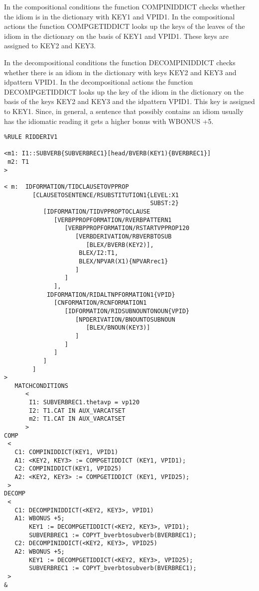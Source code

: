 In the compositional conditions the function COMPINIDDICT checks whether the
idiom is in the dictionary with KEY1 and VPID1. In the compositional actions
the function COMPGETIDDICT looks up the keys of the leaves of the idiom in the
dictionary on the basis of KEY1 and VPID1. These keys are assigned to KEY2 and
KEY3. 

In the decompositional conditions the function DECOMPINIDDICT
checks whether there is an idiom in the dictionary with keys KEY2 and KEY3
and idpattern VPID1. In the decompositional actions the function
DECOMPGETIDDICT looks up the key of the idiom in the dictionary on the basis of 
the keys KEY2 and KEY3 and the idpattern VPID1. This key is assigned to KEY1.
Since, in general, a sentence that possibly contains an idiom usually has the
idiomatic reading it gets a higher bonus with WBONUS +5. 

\begin{verbatim}
%RULE RIDDERIV1

<m1: I1::SUBVERB{SUBVERBREC1}[head/BVERB(KEY1){BVERBREC1}]
 m2: T1
>

< m:  IDFORMATION/TIDCLAUSETOVPPROP
        [CLAUSETOSENTENCE/RSUBSTITUTION1{LEVEL:X1 
                                         SUBST:2}
           [IDFORMATION/TIDVPPROPTOCLAUSE
              [VERBPPROPFORMATION/RVERBPATTERN1
                 [VERBPPROPFORMATION/RSTARTVPPROP120
                    [VERBDERIVATION/RBVERBTOSUB
                       [BLEX/BVERB(KEY2)],
                     BLEX/I2:T1,
                     BLEX/NPVAR(X1){NPVARrec1}
                    ]
                 ]
              ],
            IDFORMATION/RIDALTNPFORMATION1{VPID}
              [CNFORMATION/RCNFORMATION1
                 [IDFORMATION/RIDSUBNOUNTONOUN{VPID}
                    [NPDERIVATION/BNOUNTOSUBNOUN
                       [BLEX/BNOUN(KEY3)]
                    ]
                 ]
              ]
           ]
        ]
>
   MATCHCONDITIONS
      <
       I1: SUBVERBREC1.thetavp = vp120 
       I2: T1.CAT IN AUX_VARCATSET 
       m2: T1.CAT IN AUX_VARCATSET 
      >
COMP
 <
   C1: COMPINIDDICT(KEY1, VPID1)
   A1: <KEY2, KEY3> := COMPGETIDDICT (KEY1, VPID1);
   C2: COMPINIDDICT(KEY1, VPID25)
   A2: <KEY2, KEY3> := COMPGETIDDICT (KEY1, VPID25);
 >
DECOMP
 <
   C1: DECOMPINIDDICT(<KEY2, KEY3>, VPID1)
   A1: WBONUS +5;
       KEY1 := DECOMPGETIDDICT(<KEY2, KEY3>, VPID1);
       SUBVERBREC1 := COPYT_bverbtosubverb(BVERBREC1);
   C2: DECOMPINIDDICT(<KEY2, KEY3>, VPID25)
   A2: WBONUS +5;
       KEY1 := DECOMPGETIDDICT(<KEY2, KEY3>, VPID25);
       SUBVERBREC1 := COPYT_bverbtosubverb(BVERBREC1);
 >
&
\end{verbatim}


